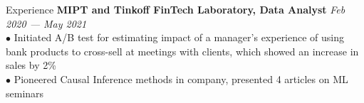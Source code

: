 \documentclass{resume} %
\begin{document}
\begin{rSection}{ Experience }
    { \bf MIPT and Tinkoff FinTech Laboratory, Data Analyst } \hfill {\em Feb 2020 — May 2021}\\
    { $\bullet$ Initiated A/B test for estimating impact of a manager's experience of using bank products to cross-sell at meetings with clients, which showed an increase in sales by 2\% }\\
    { $\bullet$ Pioneered Causal Inference methods in company, presented 4 articles on ML seminars }

\end{rSection}



    
\end{document}
